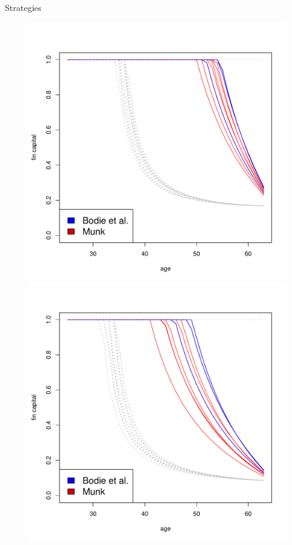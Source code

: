 \documentclass{beamer}
\begin{document}
\begin{frame}[allowframebreaks]{Strategies}
\begin{itemize}
\begin{figure}
		\includegraphics[scale=0.25]{figs/individuals15.pdf}
		\includegraphics[scale=0.25]{figs/individuals3.pdf}

\end{figure}
\end{itemize}
\end{frame}
\end{document}
